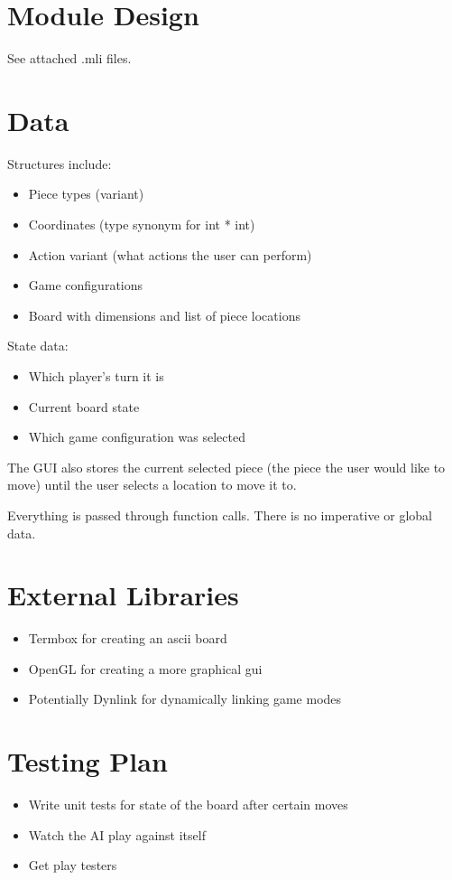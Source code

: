 \documentclass[11pt, oneside]{article}
\begin{document}
\section{Module Design}
See attached .mli files.

\section{Data}
Structures include:
\begin{itemize}
\item Piece types (variant)
\item Coordinates (type synonym for int * int)
\item Action variant (what actions the user can perform)
\item Game configurations
\item Board with dimensions and list of piece locations
\end{itemize}

State data:
\begin{itemize}
\item Which player's turn it is
\item Current board state
\item Which game configuration was selected
\end{itemize}
The GUI also stores the current selected piece (the piece the user would like to
move) until the user selects a location to move it to.

Everything is passed through function calls. There is no imperative or global
data.

\section{External Libraries}
\begin{itemize}
\item Termbox for creating an ascii board
\item OpenGL for creating a more graphical gui
\item Potentially Dynlink for dynamically linking game modes
\end{itemize}

\section{Testing Plan}
\begin{itemize}
\item Write unit tests for state of the board after certain moves
\item Watch the AI play against itself
\item Get play testers
\end{itemize}
\end{document}

